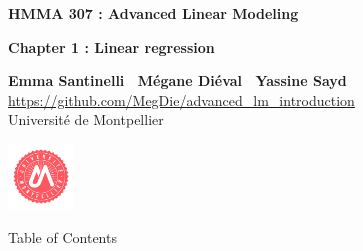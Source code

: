 \documentclass[unknownkeysallowed]{beamer}
\begin{document}



\begin{frame}
\bigskip
\bigskip
\begin{center}{
\LARGE\color{marron}
\textbf{HMMA 307 : Advanced Linear Modeling}
\textbf{ }\\
\vspace{0.5cm}
}

\color{marron}
\textbf{Chapter 1 : Linear regression}
\end{center}

\vspace{0.5cm}

\begin{center}
\textbf{Emma Santinelli \ Mégane Diéval \ Yassine Sayd} \\
\vspace{0.1cm}
\url{https://github.com/MegDie/advanced_lm_introduction}\\
\vspace{0.5cm}
Université de Montpellier \\
\end{center}

\centering
\includegraphics[width=0.13\textwidth]{umontpellier_logo}

\end{frame}






\begin{frame}{Table of Contents}
\tableofcontents[hideallsubsections]
\end{frame}
\end{document}
